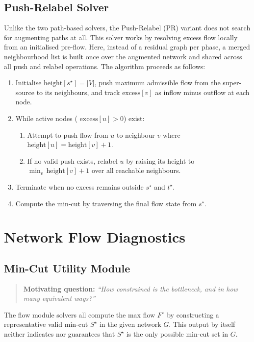 \documentclass[12pt]{report}
\begin{document}
\subsection{Push-Relabel Solver}
Unlike the two path-based solvers, the Push-Relabel (PR) variant does not search for augmenting paths at all. This solver works by resolving excess flow locally from an initialised pre-flow.
Here, instead of a residual graph per phase, a merged neighbourhood list is built once over the augmented network and shared across all push and relabel operations. The algorithm proceeds as follows:

\begin{enumerate}
    \item Initialise $\text{height}[s^\star] = |V|$, push maximum admissible flow from the super-source to its neighbours, and track $\text{excess}[v]$ as inflow minus outflow at each node.
    \item While active nodes ( $\text{excess}[u] > 0$) exist:
    \begin{enumerate}
        \item Attempt to push flow from $u$ to neighbour $v$ where 
        $\text{height}[u] = \text{height}[v] + 1$.
        \item If no valid push exists, relabel $u$ by raising its height 
        to $\min_{v}\,\text{height}[v] + 1$ over all reachable neighbours.
    \end{enumerate}
    \item Terminate when no excess remains outside $s^\star$ and $t^\star$.
    \item Compute the min-cut by traversing the final flow state from $s^\star$.
\end{enumerate}



\FloatBarrier
\section{Network Flow Diagnostics}
\subsection{Min-Cut Utility Module}
\begin{quote}
    \textbf{Motivating question:} \textit{``How constrained is the bottleneck, and in how many equivalent ways?''}
\end{quote}
The flow module solvers all compute the max flow $F^\star$ by constructing a representative valid min-cut $S^\star$ in the given network $G$. This output by itself neither indicates nor guarantees that $S^\star$ is the only possible min-cut set in $G$.
\end{document}
